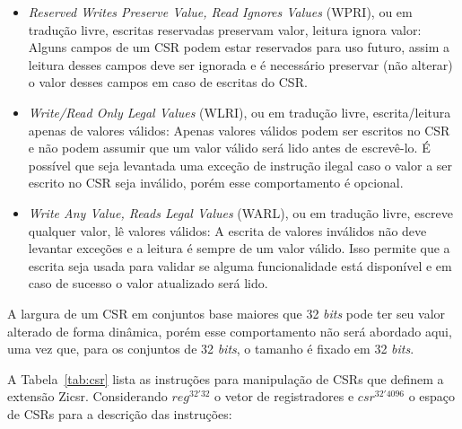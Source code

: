   \begin{itemize}
    \item \emph{Reserved Writes Preserve Value, Read Ignores Values} (WPRI), ou em tradução livre, escritas reservadas preservam valor, leitura
          ignora valor: Alguns campos de um CSR podem estar reservados para uso futuro, assim a leitura desses campos deve
          ser ignorada e é necessário preservar (não alterar) o valor desses campos em caso de escritas do CSR.
    \item \emph{Write/Read Only Legal Values} (WLRI), ou em tradução livre, escrita/leitura apenas de valores válidos: Apenas valores válidos podem
          ser escritos no CSR e não podem assumir que um valor válido será lido antes de escrevê-lo. É possível
          que seja levantada uma exceção de instrução ilegal
          caso o valor a ser escrito no CSR seja inválido, porém esse comportamento é opcional.
    \item \emph{Write Any Value, Reads Legal Values} (WARL), ou em tradução livre, escreve qualquer valor, lê valores válidos: A escrita de valores 
          inválidos não deve levantar exceções e a leitura é sempre de um valor válido. Isso permite que a escrita seja usada
          para validar se alguma funcionalidade está disponível e em caso de sucesso o valor atualizado será lido.
  \end{itemize}

  A largura de um CSR em conjuntos base maiores que 32 \emph{bits} pode ter seu valor alterado de forma dinâmica, porém
  esse comportamento não será abordado aqui, uma vez que, para os conjuntos de 32 \emph{bits}, o tamanho é fixado em 32 \emph{bits}.

  A Tabela~\ref{tab:csr} lista as instruções para manipulação de CSRs que definem a extensão Zicsr.
  Considerando $reg^{32'32}$ o vetor de registradores e $csr^{32'4096}$ o espaço de CSRs para a descrição das instruções:

